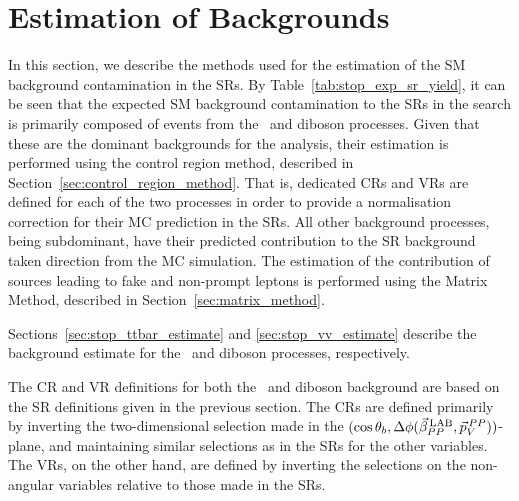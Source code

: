 \section{Estimation of Backgrounds}
\label{sec:stop_background_estimate}

In this section, we describe the methods used for the estimation of the SM background
contamination in the SRs.
By Table~\ref{tab:stop_exp_sr_yield}, it can be seen that the expected SM background
contamination to the SRs in the \bWN search is primarily composed of events
from the \ttbar~and diboson processes.
Given that these are the dominant backgrounds for the analysis, their estimation is performed
using the control region method, described in Section~\ref{sec:control_region_method}.
That is, dedicated CRs and VRs are defined for each of the two processes in order
to provide a normalisation correction for their MC prediction in the SRs.
All other background processes, being subdominant, have their predicted contribution
to the SR background taken direction from the MC simulation.
The estimation of the contribution of sources leading to fake and non-prompt leptons
is performed using the Matrix Method, described in Section~\ref{sec:matrix_method}.

Sections~\ref{sec:stop_ttbar_estimate} and \ref{sec:stop_vv_estimate} describe
the background estimate for the \ttbar~and diboson processes, respectively.


The CR and VR definitions for both the \ttbar~and diboson background are based on the
SR definitions given in the previous section.
The CRs are defined primarily by inverting the two-dimensional selection
made in the $(\cos\theta_b, \Delta \phi (\vec{\beta}_{PP}^{\,\text{LAB}}, \vec{p}_V^{\,PP}))$-plane, and maintaining similar selections as in the SRs for the other variables.
The VRs, on the other hand, are defined by inverting the selections on the non-angular variables relative to those
made in the SRs.

